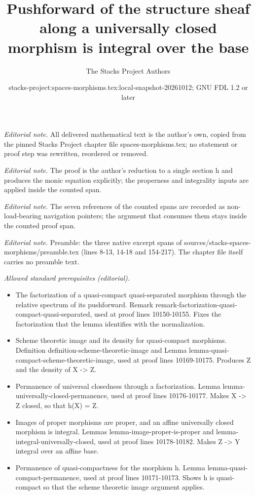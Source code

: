 \documentclass[10pt,a4paper]{amsart}
\title{Pushforward of the structure sheaf along a universally closed morphism is integral over the base}
\author{The Stacks Project Authors}
\date{stacks-project:spaces-morphisms.tex:local-snapshot-20261012; GNU FDL 1.2 or later}
\theoremstyle{plain}
\theoremstyle{definition}
\theoremstyle{remark}
\numberwithin{equation}{subsection}
\begin{document}
\maketitle
\setcounter{subsection}{1}
\noindent\textit{Editorial note.} All delivered mathematical text is the author's own, copied from the pinned Stacks Project chapter file spaces-morphisms.tex; no statement or proof step was rewritten, reordered or removed.\par\medskip
\noindent\textit{Editorial note.} The proof is the author's reduction to a single section h and produces the monic equation explicitly; the properness and integrality inputs are applied inside the counted span.\par\medskip
\noindent\textit{Editorial note.} The seven references of the counted spans are recorded as non-load-bearing navigation pointers; the argument that consumes them stays inside the counted proof span.\par\medskip
\noindent\textit{Editorial note.} Preamble: the three native excerpt spans of sources/stacks-spaces-morphisms/preamble.tex (lines 8-13, 14-18 and 154-217). The chapter file itself carries no preamble text.\par\medskip
\noindent\textit{Allowed standard prerequisites (editorial).}\begin{itemize}
\item The factorization of a quasi-compact quasi-separated morphism through the relative spectrum of its pushforward. Remark remark-factorization-quasi-compact-quasi-separated, used at proof lines 10150-10155. Fixes the factorization that the lemma identifies with the normalization.
\item Scheme theoretic image and its density for quasi-compact morphisms. Definition definition-scheme-theoretic-image and Lemma lemma-quasi-compact-scheme-theoretic-image, used at proof lines 10169-10175. Produces Z and the density of X -> Z.
\item Permanence of universal closedness through a factorization. Lemma lemma-universally-closed-permanence, used at proof lines 10176-10177. Makes X -> Z closed, so that h(X) = Z.
\item Images of proper morphisms are proper, and an affine universally closed morphism is integral. Lemmas lemma-image-proper-is-proper and lemma-integral-universally-closed, used at proof lines 10178-10182. Makes Z -> Y integral over an affine base.
\item Permanence of quasi-compactness for the morphism h. Lemma lemma-quasi-compact-permanence, used at proof lines 10171-10173. Shows h is quasi-compact so that the scheme theoretic image argument applies.
\end{itemize}\medskip
\end{document}
